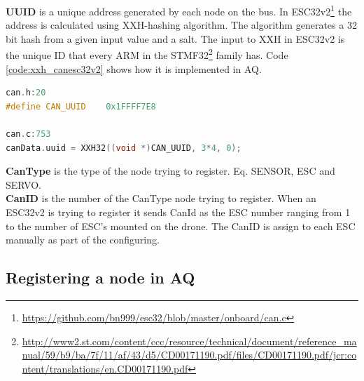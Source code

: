 \textbf{UUID} is a unique address generated by each node on the bus. In ESC32v2\footnote{\url{https://github.com/bn999/esc32/blob/master/onboard/can.c}} the address is calculated using XXH-hashing algorithm. The algorithm generates a 32 bit hash from a given input value and a salt.
The input to XXH in ESC32v2 is the unique ID that every ARM in the STMF32\footnote{\url{http://www2.st.com/content/ccc/resource/technical/document/reference_manual/59/b9/ba/7f/11/af/43/d5/CD00171190.pdf/files/CD00171190.pdf/jcr:content/translations/en.CD00171190.pdf}}
 family has. Code \ref{code:xxh_canesc32v2} shows how it is implemented in AQ.

\begin{lstlisting}[language = c, caption = Snippet showing UUID generated in ESC32v2, label=code:xxh_canesc32v2]
can.h:20
#define CAN_UUID	0x1FFFF7E8

can.c:753
canData.uuid = XXH32((void *)CAN_UUID, 3*4, 0);
\end{lstlisting}

\textbf{CanType} is the type of the node trying to register. Eq. SENSOR, ESC and SERVO.  \\

\textbf{CanID} is the number of the CanType node trying to register. When an ESC32v2 is trying to register it sends CanId as the ESC number ranging from 1 to the number of ESC's mounted on the drone. The CanID is assign to each ESC manually as part of the configuring.

\renewcommand{\mess}[4][0]{
  \stepcounter{seqlevel}
  \path
  (#2)+(0,-\theseqlevel*\unitfactor-0.7*\unitfactor) node (mess from) {};
  \addtocounter{seqlevel}{#1}
  \path
  (#4)+(0,-\theseqlevel*\unitfactor-0.7*\unitfactor) node (mess to) {};
  \draw[->,>=angle 60] (mess from) -- (mess to) node[midway, above]
  {#3};
}

\subsection{Registering a node in AQ}

